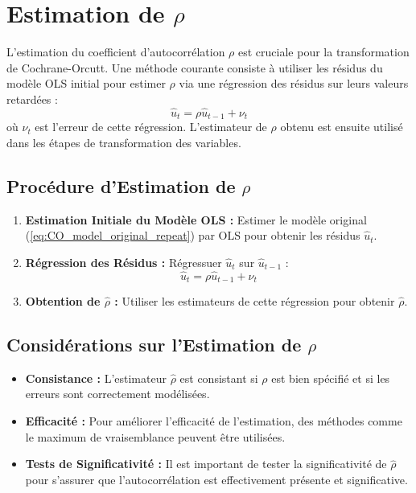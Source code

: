 \documentclass[14pt]{extarticle} %
\theoremstyle{definition}
\theoremstyle{plain}
\begin{document}
\section{Estimation de \( \rho \)}
L'estimation du coefficient d'autocorrélation \( \rho \) est cruciale pour la transformation de Cochrane-Orcutt. Une méthode courante consiste à utiliser les résidus du modèle OLS initial pour estimer \( \rho \) via une régression des résidus sur leurs valeurs retardées :
\[
\hat{u}_t = \rho \hat{u}_{t-1} + \nu_t
\]
où \( \nu_t \) est l'erreur de cette régression. L'estimateur de \( \rho \) obtenu est ensuite utilisé dans les étapes de transformation des variables.

\subsection{Procédure d'Estimation de \( \rho \)}
\begin{enumerate}
    \item \textbf{Estimation Initiale du Modèle OLS :} Estimer le modèle original (\ref{eq:CO_model_original_repeat}) par OLS pour obtenir les résidus \( \hat{u}_t \).
    \item \textbf{Régression des Résidus :} Régressuer \( \hat{u}_t \) sur \( \hat{u}_{t-1} \) :
    \[
    \hat{u}_t = \rho \hat{u}_{t-1} + \nu_t
    \]
    \item \textbf{Obtention de \( \hat{\rho} \) :} Utiliser les estimateurs de cette régression pour obtenir \( \hat{\rho} \).
\end{enumerate}

\subsection{Considérations sur l'Estimation de \( \rho \)}
\begin{itemize}
    \item \textbf{Consistance :} L'estimateur \( \hat{\rho} \) est consistant si \( \rho \) est bien spécifié et si les erreurs sont correctement modélisées.
    \item \textbf{Efficacité :} Pour améliorer l'efficacité de l'estimation, des méthodes comme le maximum de vraisemblance peuvent être utilisées.
    \item \textbf{Tests de Significativité :} Il est important de tester la significativité de \( \hat{\rho} \) pour s'assurer que l'autocorrélation est effectivement présente et significative.
\end{itemize}
\end{document}
